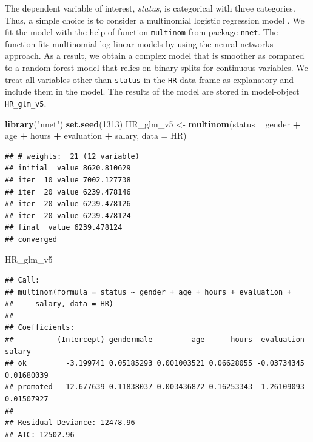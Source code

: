 \documentclass[12pt,]{krantz}
\newenvironment{Shaded}{\begin{snugshade}}{\end{snugshade}}
\newcommand{\DataTypeTok}[1]{\textcolor[rgb]{0.13,0.29,0.53}{#1}}
\newcommand{\DecValTok}[1]{\textcolor[rgb]{0.00,0.00,0.81}{#1}}
\newcommand{\KeywordTok}[1]{\textcolor[rgb]{0.13,0.29,0.53}{\textbf{#1}}}
\newcommand{\NormalTok}[1]{#1}
\newcommand{\OperatorTok}[1]{\textcolor[rgb]{0.81,0.36,0.00}{\textbf{#1}}}
\newcommand{\StringTok}[1]{\textcolor[rgb]{0.31,0.60,0.02}{#1}}
\begin{document}
The dependent variable of interest, \emph{status}, is categorical with three categories. Thus, a simple choice is to consider a multinomial logistic regression model \citep{Venables2010}. We fit the model with the help of function \texttt{multinom} from package \texttt{nnet}. The function fits multinomial log-linear models by using the neural-networks approach. As a result, we obtain a complex model that is smoother as compared to a random forest model that relies on binary splits for continuous variables. We treat all variables other than \texttt{status} in the \texttt{HR} data frame as explanatory and include them in the model. The results of the model are stored in model-object \texttt{HR\_glm\_v5}.

\begin{Shaded}
\begin{Highlighting}[]
\KeywordTok{library}\NormalTok{(}\StringTok{"nnet"}\NormalTok{)}
\KeywordTok{set.seed}\NormalTok{(}\DecValTok{1313}\NormalTok{)}
\NormalTok{HR_glm_v5 <-}\StringTok{ }\KeywordTok{multinom}\NormalTok{(status }\OperatorTok{~}\StringTok{ }\NormalTok{gender }\OperatorTok{+}\StringTok{ }\NormalTok{age }\OperatorTok{+}\StringTok{ }\NormalTok{hours }\OperatorTok{+}\StringTok{ }\NormalTok{evaluation }\OperatorTok{+}\StringTok{ }\NormalTok{salary, }\DataTypeTok{data =}\NormalTok{ HR)}
\end{Highlighting}
\end{Shaded}

\begin{verbatim}
## # weights:  21 (12 variable)
## initial  value 8620.810629 
## iter  10 value 7002.127738
## iter  20 value 6239.478146
## iter  20 value 6239.478126
## iter  20 value 6239.478124
## final  value 6239.478124 
## converged
\end{verbatim}

\begin{Shaded}
\begin{Highlighting}[]
\NormalTok{HR_glm_v5}
\end{Highlighting}
\end{Shaded}

\begin{verbatim}
## Call:
## multinom(formula = status ~ gender + age + hours + evaluation + 
##     salary, data = HR)
## 
## Coefficients:
##          (Intercept) gendermale         age      hours  evaluation     salary
## ok         -3.199741 0.05185293 0.001003521 0.06628055 -0.03734345 0.01680039
## promoted  -12.677639 0.11838037 0.003436872 0.16253343  1.26109093 0.01507927
## 
## Residual Deviance: 12478.96 
## AIC: 12502.96
\end{verbatim}
\end{document}
